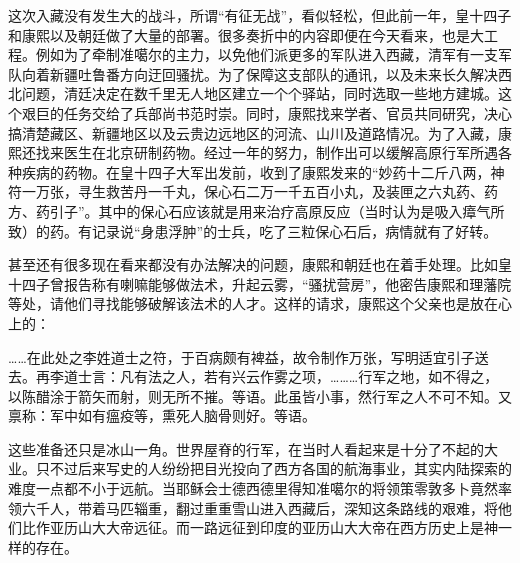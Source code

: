 
这次入藏没有发生大的战斗，所谓“有征无战”，看似轻松，但此前一年，皇十四子和康熙以及朝廷做了大量的部署。很多奏折中的内容即便在今天看来，也是大工程。例如为了牵制准噶尔的主力，以免他们派更多的军队进入西藏，清军有一支军队向着新疆吐鲁番方向迂回骚扰。为了保障这支部队的通讯，以及未来长久解决西北问题，清廷决定在数千里无人地区建立一个个驿站，同时选取一些地方建城。这个艰巨的任务交给了兵部尚书范时崇。同时，康熙找来学者、官员共同研究，决心搞清楚藏区、新疆地区以及云贵边远地区的河流、山川及道路情况。为了入藏，康熙还找来医生在北京研制药物。经过一年的努力，制作出可以缓解高原行军所遇各种疾病的药物。在皇十四子大军出发前，收到了康熙发来的“妙药十二斤八两，神符一万张，寻生救苦丹一千丸，保心石二万一千五百小丸，及装匣之六丸药、药方、药引子”。其中的保心石应该就是用来治疗高原反应（当时认为是吸入瘴气所致）的药。有记录说“身患浮肿”的士兵，吃了三粒保心石后，病情就有了好转。



甚至还有很多现在看来都没有办法解决的问题，康熙和朝廷也在着手处理。比如皇十四子曾报告称有喇嘛能够做法术，升起云雾，“骚扰营房”，他密告康熙和理藩院等处，请他们寻找能够破解该法术的人才。这样的请求，康熙这个父亲也是放在心上的：



\begin{bookquote}……在此处之李姓道士之符，于百病颇有裨益，故令制作万张，写明适宜引子送去。再李道士言：凡有法之人，若有兴云作雾之项，………行军之地，如不得之，以陈醋涂于箭矢而射，则无所不摧。等语。此虽皆小事，然行军之人不可不知。又禀称：军中如有瘟疫等，熏死人脑骨则好。等语。\end{bookquote}


这些准备还只是冰山一角。世界屋脊的行军，在当时人看起来是十分了不起的大业。只不过后来写史的人纷纷把目光投向了西方各国的航海事业，其实内陆探索的难度一点都不小于远航。当耶稣会士德西德里得知准噶尔的将领策零敦多卜竟然率领六千人，带着马匹辎重，翻过重重雪山进入西藏后，深知这条路线的艰难，将他们比作亚历山大大帝远征。而一路远征到印度的亚历山大大帝在西方历史上是神一样的存在。



